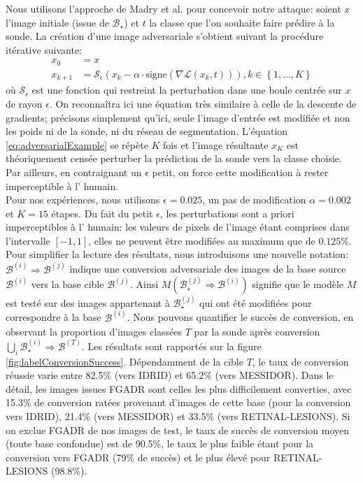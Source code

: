 Nous utilisons l'approche de Madry et al. \cite{DBLP:conf/iclr/MadryMSTV18} pour concevoir notre attaque:
soient $x$ l'image initiale (issue de $\mathcal{B}_{\star}$) et $t$ la classe que l'on souhaite faire prédire à la sonde. La création d'une image adversariale s'obtient suivant la procédure itérative suivante:
\begin{align}
	x_0 &= x \nonumber \\
	x_{k+1} &= \mathcal{S}_\epsilon(x_k - \alpha \cdot \text{signe}(\nabla \mathcal{L}(x_k, t))), k \in \left\lbrace 1,...,K
	\right\rbrace 
	\label{eq:adversarialExample}
\end{align}
où $\mathcal{S}_\epsilon$ est une fonction qui restreint la perturbation dans une boule centrée sur $x$ de rayon $\epsilon$. On reconnaîtra ici une équation très similaire à celle de la descente de gradients; précisons simplement qu'ici, seule l'image d'entrée est modifiée et non les poids ni de la sonde, ni du réseau de segmentation. L'équation \ref{eq:adversarialExample} se répète $K$ fois et l'image résultante $x_K$ est théoriquement censée perturber la prédiction de la sonde vers la classe choisie. Par ailleurs, en contraignant un $\epsilon$ petit, on force cette modification à rester imperceptible à l'\oeil{} humain. \\
Pour nos expériences, nous utilisons $\epsilon=0.025$, un pas de modification $\alpha = 0.002$ et $K=15$ étapes. Du fait du petit $\epsilon$, les perturbations sont a priori imperceptibles à l'\oeil{} humain: les valeurs de pixels de l'image étant comprises dans l'intervalle $\left[-1, 1\right]$, elles ne peuvent être modifiées au maximum que de $0.125\%$. \\
Pour simplifier la lecture des résultats, nous introduisons une nouvelle notation: $\mathcal{B}^{(i)} \Rightarrow \mathcal{B}^{(j)}$ indique une conversion adversariale des images de la base source $\mathcal{B}^{(i)}$ vers la base cible $\mathcal{B}^{(j)}$. Ainsi $M( \mathcal{B}_\star^{(j)} \Rightarrow \mathcal{B}^{(i)})$ signifie que le modèle $M$ est testé sur des images appartenant à $\mathcal{B}_\star^{(j)}$ qui ont été modifiées pour correspondre à la base  $\mathcal{B}^{(i)}$. Nous pouvons quantifier le succès de conversion, en observant la proportion d'images classées $T$ par la sonde après conversion $\bigcup_i \mathcal{B}^{(i)}_\star \Rightarrow \mathcal{B}^{(T)}$. Les résultats sont rapportés sur la figure \ref{fig:labelConversionSuccess}. Dépendamment de la cible $T$, le taux de conversion réussie varie entre  82.5\% (vers IDRID) et 65.2\% (vers MESSIDOR). Dans le détail, les images issues FGADR sont celles les plus difficilement converties, avec 15.3\% de conversion ratées provenant d'images de cette base (pour la conversion vers IDRID), 21.4\% (vers MESSIDOR) et 33.5\% (vers RETINAL-LESIONS). Si on exclue FGADR de nos images de test, le taux de succès de conversion moyen (toute base confondue) est de 90.5\%, le taux le plus faible étant pour la conversion vers FGADR (79\% de succès) et le plus élevé pour RETINAL-LESIONS (98.8\%).

